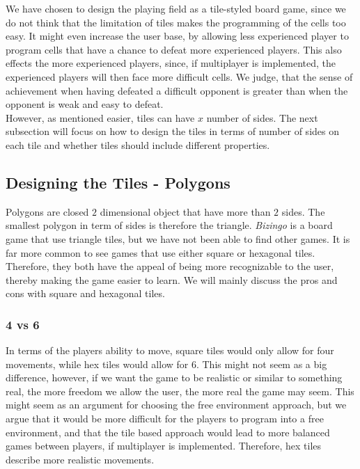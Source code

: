 We have chosen to design the playing field as a tile-styled board game, since we do not think that the limitation of tiles makes the programming of the cells too easy. It might even increase the user base, by allowing less experienced player to program cells that have a chance to defeat more experienced players. This also effects the more experienced players, since, if multiplayer is implemented, the experienced players will then face more difficult cells. We judge, that the sense of achievement when having defeated a difficult opponent is greater than when the opponent is weak and easy to defeat.\\

However, as mentioned easier, tiles can have $x$ number of sides. The next subsection will focus on how to design the tiles in terms of number of sides on each tile and whether tiles should include different properties.

\subsection{Designing the Tiles - Polygons}

Polygons are closed $2$ dimensional object that have more than $2$ sides.
The smallest polygon in term of sides is therefore the triangle.
\textit{Bizingo} is a board game that use triangle tiles, but we have not been able to find other games.
It is far more common to see games that use either square or hexagonal tiles.
Therefore, they both have the appeal of being more recognizable to the user, thereby making the game easier to learn.
We will mainly discuss the pros and cons with square and hexagonal tiles.\\

\subsubsection{4 vs 6}

In terms of the players ability to move, square tiles would only allow for four movements, while hex tiles would allow for 6.
This might not seem as a big difference, however, if we want the game to be realistic or similar to something real, the more freedom we allow the user, the more real the game may seem.
This might seem as an argument for choosing the free environment approach, but we argue that it would be more difficult for the players to program into a free environment, and that the tile based approach would lead to more balanced games between players, if multiplayer is implemented.
Therefore, hex tiles describe more realistic movements.\\

